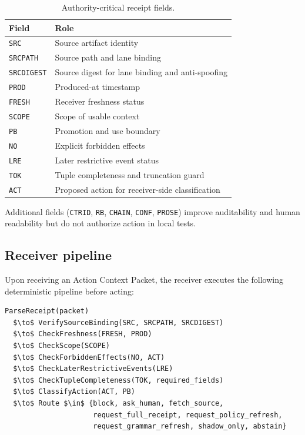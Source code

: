\documentclass[11pt]{article}
\begin{document}
\begin{table}[h]
\centering
\caption{Authority-critical receipt fields.}
\label{tab:fields}
\begin{tabular}{@{}ll@{}}
\toprule
\textbf{Field} & \textbf{Role} \\
\midrule
\texttt{SRC}      & Source artifact identity \\
\texttt{SRCPATH}  & Source path and lane binding \\
\texttt{SRCDIGEST}& Source digest for lane binding and anti-spoofing \\
\texttt{PROD}     & Produced-at timestamp \\
\texttt{FRESH}    & Receiver freshness status \\
\texttt{SCOPE}    & Scope of usable context \\
\texttt{PB}       & Promotion and use boundary \\
\texttt{NO}       & Explicit forbidden effects \\
\texttt{LRE}      & Later restrictive event status \\
\texttt{TOK}      & Tuple completeness and truncation guard \\
\texttt{ACT}      & Proposed action for receiver-side classification \\
\bottomrule
\end{tabular}
\end{table}

Additional fields (\texttt{CTRID}, \texttt{RB}, \texttt{CHAIN}, \texttt{CONF},
\texttt{PROSE}) improve auditability and human readability but do not authorize action
in local tests.

\subsection{Receiver pipeline}

Upon receiving an Action Context Packet, the receiver executes the following
deterministic pipeline before acting:

\begin{lstlisting}[language={}, mathescape=true]
ParseReceipt(packet)
  $\to$ VerifySourceBinding(SRC, SRCPATH, SRCDIGEST)
  $\to$ CheckFreshness(FRESH, PROD)
  $\to$ CheckScope(SCOPE)
  $\to$ CheckForbiddenEffects(NO, ACT)
  $\to$ CheckLaterRestrictiveEvents(LRE)
  $\to$ CheckTupleCompleteness(TOK, required_fields)
  $\to$ ClassifyAction(ACT, PB)
  $\to$ Route $\in$ {block, ask_human, fetch_source,
                     request_full_receipt, request_policy_refresh,
                     request_grammar_refresh, shadow_only, abstain}
\end{lstlisting}
\end{document}
